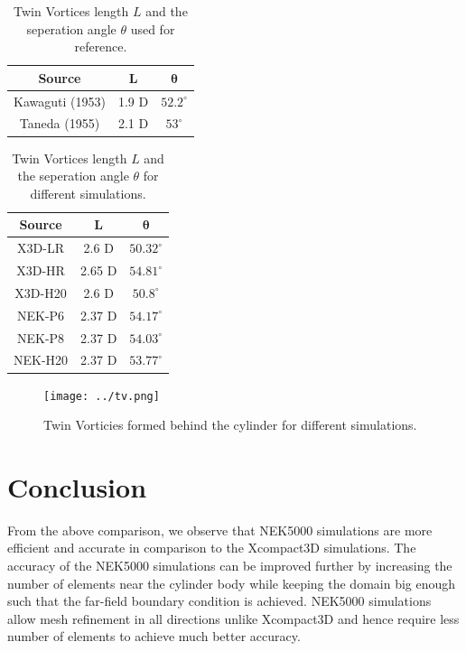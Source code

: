\documentclass[11pt]{article}
\begin{document}
\begin{table}[H]
    \centering
    \caption{Twin Vortices length $L$ and the seperation angle $\theta$ used for reference.}
    \begin{tabular}{|c|c|c|}
        \hline
        \textbf{Source} & $\mathbf{L}$ & $\mathbf{\theta}$ \\
        \hline
        Kawaguti (1953) & 1.9 D        & $52.2^{\circ}$    \\
        \hline
        Taneda (1955)   & 2.1 D        & $53^{\circ}$      \\
        \hline
    \end{tabular}
\end{table}

\begin{table}[H]
    \centering
    \caption{Twin Vortices length $L$ and the seperation angle $\theta$ for different simulations.}
    \label{table:tv}
    \begin{tabular}{|c|c|c|}
        \hline
        \textbf{Source} & $\mathbf{L}$ & $\mathbf{\theta}$ \\
        \hline
        X3D-LR          & 2.6 D        & $50.32^{\circ}$   \\
        \hline
        X3D-HR          & 2.65 D       & $54.81^{\circ}$   \\
        \hline
        X3D-H20         & 2.6 D        & $50.8^{\circ}$    \\
        \hline
        NEK-P6          & 2.37 D       & $54.17^{\circ}$   \\
        \hline
        NEK-P8          & 2.37 D       & $54.03^{\circ}$   \\
        \hline
        NEK-H20         & 2.37 D       & $53.77^{\circ}$   \\
        \hline
    \end{tabular}
\end{table}

\begin{figure}[H]
    \centering
    \texttt{[image: ../tv.png]}
    \caption{Twin Vorticies formed behind the cylinder for different simulations.}
    \label{fig:xv}
\end{figure}

\section{Conclusion}
From the above comparison, we observe that NEK5000 simulations are more efficient and accurate in comparison
to the Xcompact3D simulations. The accuracy of the NEK5000 simulations can be improved further by increasing
the number of elements near the cylinder body while keeping the domain big enough such that the
far-field boundary condition is achieved. NEK5000 simulations allow mesh refinement in all directions unlike Xcompact3D
and hence require less number of elements to achieve much better accuracy.
\end{document}
